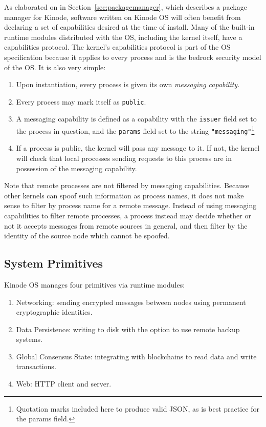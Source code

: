\documentclass[runningheads]{llncs}
\begin{document}
As elaborated on in Section~\ref{sec:packagemanager}, which describes a package manager for Kinode, software written on Kinode OS will often benefit from declaring a set of capabilities desired at the time of install.
Many of the built-in runtime modules distributed with the OS, including the kernel itself, have a capabilities protocol.
The kernel's capabilities protocol is part of the OS specification because it applies to every process and is the bedrock security model of the OS.
It is also very simple:
\begin{enumerate}
    \item Upon instantiation, every process is given its own \textit{messaging capability}.
    \item Every process may mark itself as \verb|public|.
    \item A messaging capability is defined as a capability with the \verb|issuer| field set to the process in question, and the \verb|params| field set to the string \verb|"messaging"|\footnote{Quotation marks included here to produce valid JSON, as is best practice for the params field.}
    \item If a process is public, the kernel will pass any message to it. If not, the kernel will check that local processes sending requests to this process are in possession of the messaging capability.
\end{enumerate}

Note that remote processes are not filtered by messaging capabilities.
Because other kernels can spoof such information as process names, it does not make sense to filter by process name for a remote message.
Instead of using messaging capabilities to filter remote processes, a process instead may decide whether or not it accepts messages from remote sources in general, and then filter by the identity of the source node which cannot be spoofed.

\subsection{System Primitives}
\label{sec:osprimitives}

Kinode OS manages four primitives via runtime modules:

\begin{enumerate}
    \item Networking: sending encrypted messages between nodes using permanent cryptographic identities.
    \item Data Persistence: writing to disk with the option to use remote backup systems.
    \item Global Consensus State: integrating with blockchains to read data and write transactions.
    \item Web: HTTP client and server.
\end{enumerate}
\end{document}
